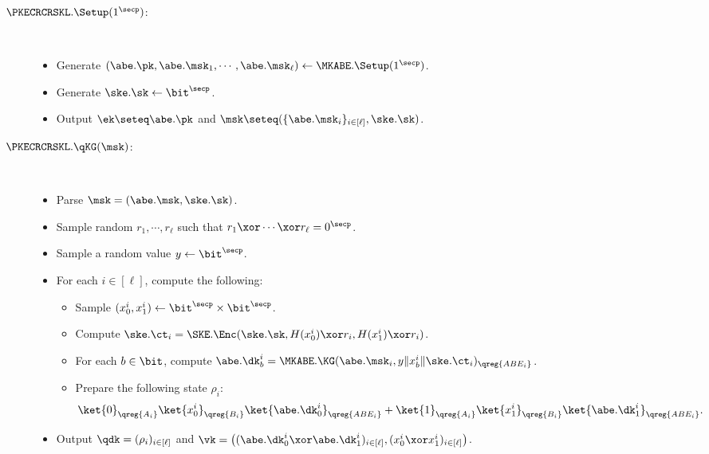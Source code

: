 \begin{description}
\item[$\PKECRCRSKL.\Setup(1^\secp)$:] $ $
\begin{itemize}
\item Generate $(\abe.\pk,\abe.\msk_1, \cdots, \abe.\msk_\ell)\gets\MKABE.\Setup(1^\secp)$.
\item Generate $\ske.\sk\gets \bit^\secp$.
\item Output $\ek\seteq\abe.\pk$ and
    $\msk\seteq(\{\abe.\msk_i\}_{i\in[\ell]},\ske.\sk)$.
\end{itemize}

\item[$\PKECRCRSKL.\qKG(\msk)$:] $ $
\begin{itemize}
\item Parse $\msk=(\abe.\msk,\ske.\sk)$.
\item Sample random $r_1, \cdots, r_\ell$ such that $r_1 \xor \cdots
\xor r_\ell = 0^{\secp}$.
\item Sample a random value $y \gets \bit^\secp$.

\item For each $i \in [\ell]$, compute the following:
\begin{itemize}
\item Sample $(x_0^i, x_1^i) \leftarrow
\bit^\secp \times \bit^\secp$.

\item Compute $\ske.\ct_i = \SKE.\Enc(\ske.\sk, H(x_0^i) \xor r_i,
H(x_1^i) \xor r_i)$.

\item For each $b \in \bit$, compute $\abe.\dk_b^i =
\MKABE.\KG(\abe.\msk_i, y \| x_b^i \| \ske.\ct_i)_\qreg{ABE_i}$.

\item
Prepare the following state $\rho_i$:
$$\ket{0}_{\qreg{A_i}}\ket{x_0^i}_{\qreg{B_i}}\ket{\abe.\dk_0^i}_\qreg{ABE_i} +
\ket{1}_{\qreg{A_i}}\ket{x_1^i
}_{\qreg{B_i}}\ket{\abe.\dk_1^i}_\qreg{ABE_i}.$$


\end{itemize}
\item Output $\qdk = (\rho_i)_{i \in [\ell]}$ and $\vk =
\big((\abe.\dk_0^i \xor \abe.\dk_1^i)_{i \in [\ell]}, (x_0^i
\xor x_1^i)_{i \in [\ell]}\big)$.
\end{itemize}


\end{description}
